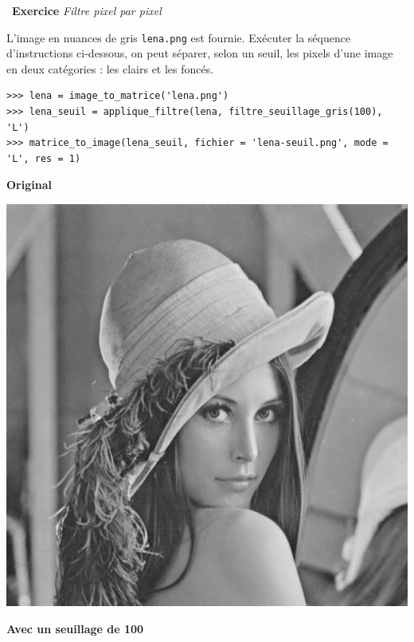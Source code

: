 \documentclass[a4paper, french, 12pt]{article}
\newcounter{exo}
\newenvironment{exercice}[1]
{\par \medskip   \addtocounter{exo}{1} \noindent  
\begin{bclogo}[arrondi =0.1,   noborder = true, logo=\bccrayon, marge=4]{~\textbf{Exercice} \textbf{\theexo} {\itshape #1} }  \par}
{
\end{bclogo}
 \par \bigskip }
\begin{document}
\begin{exercice}{Filtre pixel par pixel}
\begin{enumerate}
L'image en nuances de gris \texttt{lena.png} est fournie. Exécuter la séquence d'instructions ci-dessous, on peut séparer, selon un seuil, les pixels d'une image en deux catégories  : les clairs et les foncés.

\begin{lstlisting}[style=compil]
>>> lena = image_to_matrice('lena.png')
>>> lena_seuil = applique_filtre(lena, filtre_seuillage_gris(100), 'L')
>>> matrice_to_image(lena_seuil, fichier = 'lena-seuil.png', mode = 'L', res = 1)
\end{lstlisting}



\begin{minipage}{0.45\linewidth}
\begin{center}
\textbf{Original}

\includegraphics[scale=0.25]{images/lena.png}
\end{center}
\end{minipage}\hfill
\begin{minipage}{0.45\linewidth}
\begin{center}
\textbf{Avec un seuillage de 100}


\end{center}
\end{minipage}
\end{enumerate}
\end{exercice}
\end{document}
